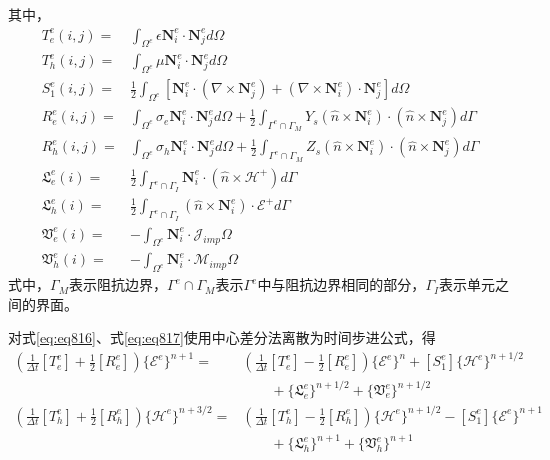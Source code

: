 \documentclass{article}
\numberwithin{equation}{section}
\renewcommand{\vec}[1]{\boldsymbol{#1}}
\begin{document}
其中，
\begin{align}
    \label{eq:eq818}
    T_e^e(i,j)=&\int_{\Omega^e}\epsilon\mathbf{N}_i^e\cdot\mathbf{N}_j^ed\Omega \\
    \label{eq:eq819}
    T_h^e(i,j)=&\int_{\Omega^e}\mu\mathbf{N}_i^e\cdot\mathbf{N}_j^ed\Omega \\
    \label{eq:eq820}
    S_1^e(i,j)=&\frac{1}{2}\int_{\Omega^e}\left[\mathbf{N}_i^e\cdot\left(\nabla\times\mathbf{N}_j^e\right)+\left(\nabla\times\mathbf{N}_i^e\right)\cdot\mathbf{N}_j^e\right]d\Omega \\
    \label{eq:eq821}
    R_e^e(i,j)=&\int_{\Omega^e}\sigma_e\mathbf{N}_i^e\cdot\mathbf{N}_j^ed\Omega+\frac{1}{2}\int_{\Gamma^e\cap\Gamma_M}Y_s(\hat{n}\times\mathbf{N}_i^e)\cdot(\hat{n}\times\mathbf{N}_j^e)d\Gamma \\
    \label{eq:eq822}
    R_h^e(i,j)=&\int_{\Omega^e}\sigma_h\mathbf{N}_i^e\cdot\mathbf{N}_j^ed\Omega+\frac{1}{2}\int_{\Gamma^e\cap\Gamma_M}Z_s(\hat{n}\times\mathbf{N}_i^e)\cdot(\hat{n}\times\mathbf{N}_j^e)d\Gamma \\
    \label{eq:eq823}
    \mathfrak{L}_e^e(i)=&\frac{1}{2}\int_{\Gamma^e\cap\Gamma_I}\mathbf{N}_i^e\cdot(\hat{n}\times\vec{\mathcal{H}}^+)d\Gamma \\
    \label{eq:eq824}
    \mathfrak{L}_h^e(i)=&\frac{1}{2}\int_{\Gamma^e\cap\Gamma_I}(\hat{n}\times\mathbf{N}_i^e)\cdot\vec{\mathcal{E}}^+d\Gamma \\
    \label{eq:eq825}
    \mathfrak{V}_e^e(i)=&-\int_{\Omega^e}\mathbf{N}_i^e\cdot\vec{\mathcal{J}}_{imp}\Omega \\
    \label{eq:eq826}
    \mathfrak{V}_h^e(i)=&-\int_{\Omega^e}\mathbf{N}_i^e\cdot\vec{\mathcal{M}}_{imp}\Omega
\end{align}
式中，$\Gamma_M$表示阻抗边界，$\Gamma^e\cap\Gamma_M$表示$\Gamma^e$中与阻抗边界相同的部分，$\Gamma_I$表示单元之间的界面。\par
对式\ref{eq:eq816}、式\ref{eq:eq817}使用中心差分法离散为时间步进公式，得
\begin{align}
    \label{eq:eq827}
    \left(\frac{1}{\Delta t}[T_e^e]+\frac{1}{2}[R_e^e]\right)\{\mathcal{E}^e\}^{n+1}=&\left(\frac{1}{\Delta t}[T_e^e]-\frac{1}{2}[R_e^e]\right)\{\mathcal{E}^e\}^{n}+[S_1^e]\{\mathcal{H}^e\}^{n+1/2} \nonumber \\
                                                                                     &\qquad+\{\mathfrak{L}_e^e\}^{n+1/2}+\{\mathfrak{V}_e^e\}^{n+1/2} \\
    \label{eq:eq828}
    \left(\frac{1}{\Delta t}[T_h^e]+\frac{1}{2}[R_h^e]\right)\{\mathcal{H}^e\}^{n+3/2}=&\left(\frac{1}{\Delta t}[T_h^e]-\frac{1}{2}[R_h^e]\right)\{\mathcal{H}^e\}^{n+1/2}-[S_1^e]\{\mathcal{E}^e\}^{n+1} \nonumber \\
                                                                                       &\qquad+\{\mathfrak{L}_h^e\}^{n+1}+\{\mathfrak{V}_h^e\}^{n+1}
\end{align}
\end{document}
